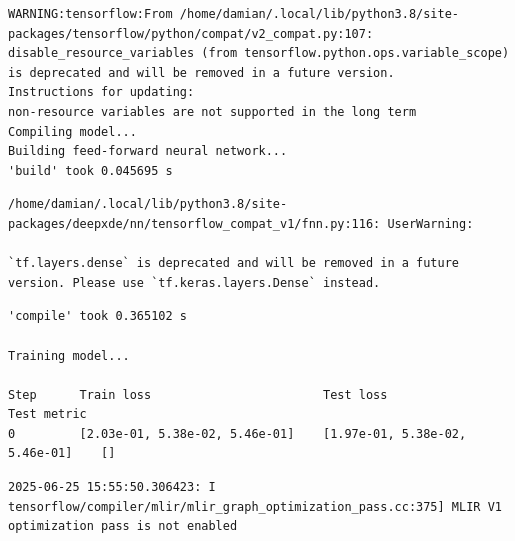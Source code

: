 \documentclass[
  spanish,
  us-letterpaper,
  DIV=11,
  numbers=noendperiod]{scrreprt}
\theoremstyle{plain}
\theoremstyle{definition}
\theoremstyle{remark}
\begin{document}
\begin{verbatim}
WARNING:tensorflow:From /home/damian/.local/lib/python3.8/site-packages/tensorflow/python/compat/v2_compat.py:107: disable_resource_variables (from tensorflow.python.ops.variable_scope) is deprecated and will be removed in a future version.
Instructions for updating:
non-resource variables are not supported in the long term
Compiling model...
Building feed-forward neural network...
'build' took 0.045695 s
\end{verbatim}

\begin{verbatim}
/home/damian/.local/lib/python3.8/site-packages/deepxde/nn/tensorflow_compat_v1/fnn.py:116: UserWarning:

`tf.layers.dense` is deprecated and will be removed in a future version. Please use `tf.keras.layers.Dense` instead.
\end{verbatim}

\begin{verbatim}
'compile' took 0.365102 s

Training model...

Step      Train loss                        Test loss                         Test metric
0         [2.03e-01, 5.38e-02, 5.46e-01]    [1.97e-01, 5.38e-02, 5.46e-01]    []  
\end{verbatim}

\begin{verbatim}
2025-06-25 15:55:50.306423: I tensorflow/compiler/mlir/mlir_graph_optimization_pass.cc:375] MLIR V1 optimization pass is not enabled
\end{verbatim}
\end{document}
